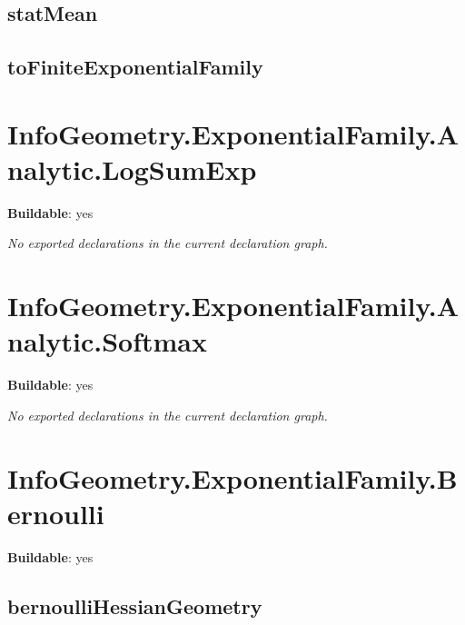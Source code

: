 \begin{theorem}[blueprint="infogeometry:exponentialfamily:log_density_eq"]
\end{theorem}

\subsection*{statMean}

\begin{theorem}[blueprint="infogeometry:exponentialfamily:statmean"]
\end{theorem}

\subsection*{toFiniteExponentialFamily}

\begin{theorem}[blueprint="infogeometry:exponentialfamily:tofiniteexponentialfamily"]
\end{theorem}

\section{InfoGeometry.ExponentialFamily.Analytic.LogSumExp}

\noindent\textbf{Buildable}: yes

\noindent\emph{No exported declarations in the current declaration graph.}

\section{InfoGeometry.ExponentialFamily.Analytic.Softmax}

\noindent\textbf{Buildable}: yes

\noindent\emph{No exported declarations in the current declaration graph.}

\section{InfoGeometry.ExponentialFamily.Bernoulli}

\noindent\textbf{Buildable}: yes

\subsection*{bernoulliHessianGeometry}


